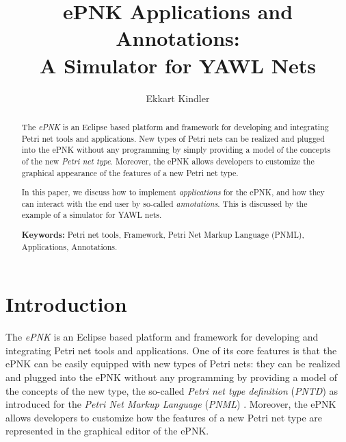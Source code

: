 \documentclass[a4paper]{llncs}
\title{
  ePNK Applications and Annotations:\\
  A Simulator for YAWL Nets%
}
\author{Ekkart Kindler}
\institute{Software Engineering Section, DTU Compute, Technical University of Denmark\\
\email{ekki@dtu.dk}
}
\begin{document}
\maketitle

\begin{abstract}

The \emph{ePNK} is an Eclipse based platform and framework for developing and
integrating Petri net tools and applications. 
New types of Petri nets can be realized and plugged into the ePNK without any
programming by simply providing a model of the concepts of the new \emph{Petri net type}.
Moreover, the ePNK allows developers to customize the graphical appearance of
the features of a new Petri net type.

In this paper, we discuss how to implement \emph{applications}
for the ePNK, and how they can interact with the end user
by so-called \emph{annotations}. This is discussed by the example of
a simulator for YAWL nets.

{\bf Keywords:}
  Petri net tools,
  Framework,
  Petri Net Markup Language (PNML),
  Applications,
  Annotations.
\end{abstract}


\section{Introduction}
\label{sec:intro}


The \emph{ePNK} is an Eclipse based platform and framework for developing and
integrating Petri net tools and applications. One of its core features is that
the ePNK can be easily equipped with new types of Petri nets:
they  can be realized and plugged into the ePNK without any
programming by providing a model of the concepts of the new type, the so-called
\emph{Petri net type definition} (\emph{PNTD}) as introduced for the
\emph{Petri Net Markup Language} (\emph{PNML}) \cite{HKea09,ISO-IEC:15909-2-2011}.
Moreover, the ePNK allows developers to customize how the features of a
new Petri net type are represented in the graphical editor of
the ePNK.
\end{document}
